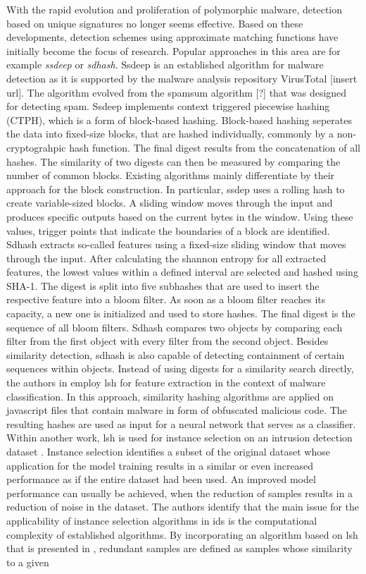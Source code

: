 \documentclass[../../main.tex]{subfiles}
\begin{document}
With the rapid evolution and proliferation of polymorphic malware, detection based on unique signatures no longer seems effective. Based on these developments, detection schemes using approximate matching functions have initially become the focus of research. Popular approaches in this area are for example \textit{ssdeep} or \textit{sdhash}. Ssdeep \cite{kornblum_identifying_2006} is an established algorithm for malware detection as it is supported by the malware analysis repository VirusTotal [insert url]. The algorithm evolved from the spamsum algorithm [?] that was designed for detecting spam. Ssdeep implements context triggered piecewise hashing (CTPH), which is a form of block-based hashing. Block-based hashing seperates the data into fixed-size blocks, that are hashed individually, commonly by a non-cryptograhpic hash function. The final digest results from the concatenation of all hashes. The similarity of two digests can then be measured by comparing the number of common blocks. Existing algorithms mainly differentiate by their approach for the block construction. In particular, ssdep uses a rolling hash to create variable-sized blocks. A sliding window moves through the input and produces specific outputs based on the current bytes in the window. Using these values, trigger points that indicate the boundaries of a block are identified. Sdhash \cite{chow_data_2010} extracts so-called features using a fixed-size sliding window that moves through the input. After calculating the shannon entropy for all extracted features, the lowest values within a defined interval are selected and hashed using SHA-1. The digest is split into five subhashes that are used to insert the respective feature into a bloom filter. As soon as a bloom filter reaches its capacity, a new one is initialized and used to store hashes. The final digest is the sequence of all bloom filters. Sdhash compares two objects by comparing each filter from the first object with every filter from the second object. Besides similarity detection, sdhash is also capable of detecting containment of certain sequences within objects. Instead of using digests for a similarity search directly, the authors in \cite{ludwig_friborg_malware_2019} employ \gls{lsh} for feature extraction in the context of malware classification. In this approach, similarity hashing algorithms are applied on javascript files that contain malware in form of obfuscated malicious code. The resulting hashes are used as input for a neural network that serves as a classifier. Within another work, \gls{lsh} is used for instance selection on an intrusion detection dataset \cite{baldini2021intrusion}. Instance selection identifies a subset of the original dataset whose application for the model training results in a similar or even increased performance as if the entire dataset had been used. An improved model performance can usually be achieved, when the reduction of samples results in a reduction of noise in the dataset. The authors identify that the main issue for the applicability of instance selection algorithms in \gls{ids} is the computational complexity of established algorithms. By incorporating an algorithm based on \gls{lsh} that is presented in \cite{aslani2020fast}, redundant samples are defined as samples whose similarity to a given 
\end{document}
